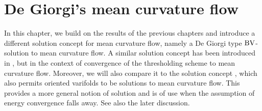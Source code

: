 \chapter{De Giorgi's mean curvature flow}
\label{chapter_de_giorgis_mcf}

In this chapter, we build on the results of the previous chapters and introduce 
a different solution concept for mean curvature flow, namely a De Giorgi type $ 
\operatorname{BV} 
$-solution to mean curvature flow. A similar solution concept has been 
introduced in 
\cite[Def.~1]{laux_lelmi_de_giorgis_inequality_for_the_threshholding_scheme}, 
but in the context of convergence of the thresholding scheme to mean curvature 
flow. Moreover, we will also compare it to the solution concept 
\cite[Def.~1]{hensel_laux_varifold_solution_concept_for_mean_curvature_flow}, 
which also permits oriented varifolds to be solutions to mean curvature flow. 
This provides a more general notion of solution and is of use when the 
assumption of energy convergence falls away. See also the later discussion.




